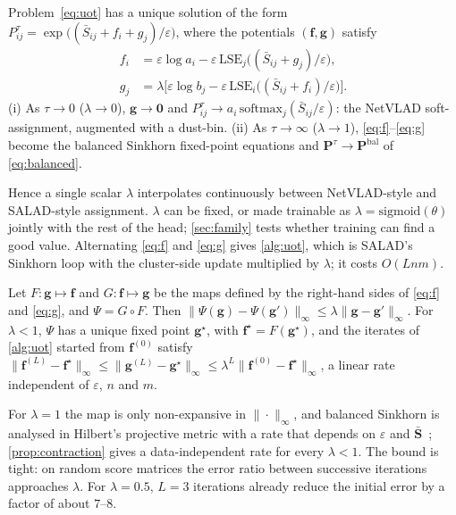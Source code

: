 \begin{proposition}\label{prop:uot}
Problem~\eqref{eq:uot} has a unique solution of the form
$P^{\tau}_{ij}=\exp\big((\bar S_{ij}+f_i+g_j)/\varepsilon\big)$, where the potentials
$(\mathbf{f},\mathbf{g})$ satisfy
\begin{align}
f_i &= \varepsilon\log a_i-\varepsilon\,\mathrm{LSE}_j\big((\bar S_{ij}+g_j)/\varepsilon\big),\label{eq:f}\\
g_j &= \lambda\big[\varepsilon\log b_j-\varepsilon\,\mathrm{LSE}_i\big((\bar S_{ij}+f_i)/\varepsilon\big)\big].\label{eq:g}
\end{align}
(i) As $\tau\to0$ ($\lambda\to0$), $\mathbf{g}\to\mathbf{0}$ and
$P^{\tau}_{ij}\to a_i\,\mathrm{softmax}_j(\bar S_{ij}/\varepsilon)$: the NetVLAD soft-assignment,
augmented with a dust-bin.
(ii) As $\tau\to\infty$ ($\lambda\to1$), \eqref{eq:f}--\eqref{eq:g} become the balanced Sinkhorn
fixed-point equations and $\mathbf{P}^{\tau}\to\mathbf{P}^{\mathrm{bal}}$ of \eqref{eq:balanced}.
\end{proposition}
Hence a single scalar $\lambda$ interpolates continuously between NetVLAD-style and
SALAD-style assignment. $\lambda$ can be fixed, or made trainable as $\lambda=\mathrm{sigmoid}(\theta)$
jointly with the rest of the head; \cref{sec:family} tests whether training can find a good value. Alternating \eqref{eq:f} and \eqref{eq:g} gives \cref{alg:uot}, which is SALAD's
Sinkhorn loop with the cluster-side update multiplied by $\lambda$; it costs $O(Lnm)$.

\begin{proposition}\label{prop:contraction}
Let $F:\mathbf{g}\mapsto\mathbf{f}$ and $G:\mathbf{f}\mapsto\mathbf{g}$ be the maps defined by the right-hand
sides of \eqref{eq:f} and \eqref{eq:g}, and $\Psi=G\circ F$. Then
$\|\Psi(\mathbf{g})-\Psi(\mathbf{g}')\|_\infty\le\lambda\|\mathbf{g}-\mathbf{g}'\|_\infty$. For $\lambda<1$,
$\Psi$ has a unique fixed point $\mathbf{g}^\star$, with $\mathbf{f}^\star=F(\mathbf{g}^\star)$, and the
iterates of \cref{alg:uot} started from $\mathbf{f}^{(0)}$ satisfy
$\|\mathbf{f}^{(L)}-\mathbf{f}^\star\|_\infty\le\|\mathbf{g}^{(L)}-\mathbf{g}^\star\|_\infty\le\lambda^{L}\|\mathbf{f}^{(0)}-\mathbf{f}^\star\|_\infty$,
a linear rate independent of $\varepsilon$, $n$ and $m$.
\end{proposition}
For $\lambda=1$ the map is only non-expansive in $\|\cdot\|_\infty$, and balanced Sinkhorn is analysed
in Hilbert's projective metric with a rate that depends on $\varepsilon$ and
$\bar{\mathbf{S}}$~\cite{peyre2019computational}; \cref{prop:contraction} gives a data-independent
rate for every $\lambda<1$. The bound is tight: on random score matrices the error ratio between
successive iterations approaches $\lambda$. For $\lambda=0.5$, $L=3$ iterations already reduce the initial error by a factor of about $7$--$8$.

